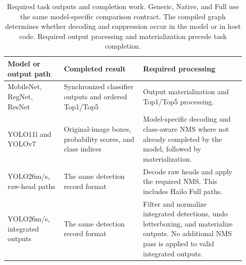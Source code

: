 \begin{table}[t]
\centering\small
\caption{Required task outputs and completion work. Generic, Native, and Full use the same model-specific comparison contract. The compiled graph determines whether decoding and suppression occur in the model or in host code. Required output processing and materialization precede task completion.}
\label{tab:supp-endpoint-contracts}
\setlength{\tabcolsep}{3pt}
\begin{tabular}{@{}>{\raggedright\arraybackslash}p{0.22\linewidth}>{\raggedright\arraybackslash}p{0.31\linewidth}>{\raggedright\arraybackslash}p{0.4\linewidth}@{}}
\toprule
Model or output path & Completed result & Required processing \\
\midrule
MobileNet, RegNet, ResNet & Synchronized classifier outputs and ordered Top1/Top5 & Output materialization and Top1/Top5 processing. \\
YOLO11l and YOLOv7 & Original-image boxes, probability scores, and class indices & Model-specific decoding and class-aware NMS where not already completed by the model, followed by materialization. \\
YOLO26m/s, raw-head paths & The same detection record format & Decode raw heads and apply the required NMS. This includes Hailo Full paths. \\
YOLO26m/s, integrated outputs & The same detection record format & Filter and normalize integrated detections, undo letterboxing, and materialize outputs. No additional NMS pass is applied to valid integrated outputs. \\
\bottomrule
\end{tabular}
\end{table}
